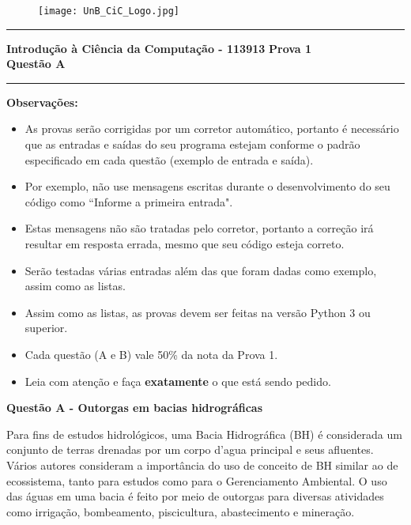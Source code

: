 \documentclass[a4paper, 12pt]{article}
\begin{document}
\begin{figure}[H]
	\texttt{[image: UnB\_CiC\_Logo.jpg]}
\end{figure}
\noindent\rule{\textwidth}{0.4pt}
\begin{center}
	\textbf{{\Large Introdução à Ciência da Computação - 113913}} \newline \newline
	\textbf{{\large Prova 1} \\
	\vspace{9pt}
	{\large Questão A}} \\
	\noindent\rule{\textwidth}{0.4pt}
	\newline
\end{center}

\textbf{{\large Observações:}}
\begin{itemize}
	\item As provas serão corrigidas por um corretor automático, portanto é necessário que as entradas e saídas do seu programa estejam conforme o padrão especificado em cada questão (exemplo de entrada e saída).
	\item Por exemplo, não use mensagens escritas durante o desenvolvimento do seu código como “Informe a primeira entrada".
	\item Estas mensagens não são tratadas pelo corretor, portanto a correção irá resultar em resposta errada, mesmo que seu código esteja correto.
	\item Serão testadas várias entradas além das que foram dadas como exemplo, assim como as listas.
	\item Assim como as listas, as provas devem ser feitas na versão Python 3 ou superior.
	\item Cada questão (A e B) vale 50\% da nota da Prova 1.
	\item Leia com atenção e faça \textbf{exatamente} o que está sendo pedido.


\end{itemize}
\newpage %
\begin{center}
\textbf{{\Large Questão A - Outorgas em bacias hidrográficas}}
\end{center}

\vspace{5pt} 

Para fins de estudos hidrológicos, uma Bacia Hidrográfica (BH) é considerada um conjunto de terras drenadas por um corpo d’agua principal e seus afluentes. Vários autores consideram a importância do uso de conceito de BH similar ao de ecossistema, tanto para estudos como para o Gerenciamento Ambiental. O uso das águas em uma bacia é feito por meio de outorgas para diversas atividades como irrigação, bombeamento, piscicultura, abastecimento e mineração.
\end{document}
